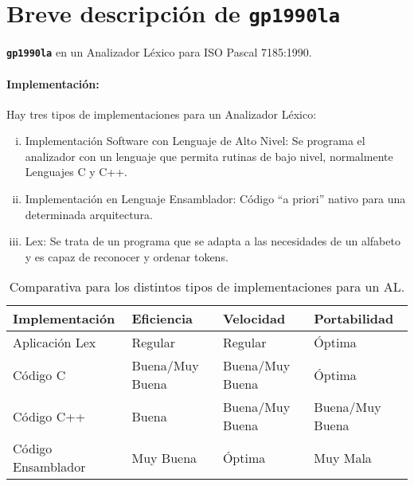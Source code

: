 \section{Breve descripción de {\tt gp1990la}}

 {}\textbf{{\tt gp1990la}} en un Analizador Léxico para ISO Pascal 7185:1990.

\paragraph*{Implementación:} Hay tres tipos de implementaciones para un Analizador Léxico:

\begin{enumerate}[i.]

\item Implementación Software con Lenguaje de Alto Nivel: Se programa el 
analizador con un lenguaje que permita rutinas de bajo nivel, normalmente 
Lenguajes C y C++.
\item Implementación en Lenguaje Ensamblador: Código ``a priori'' nativo para
una determinada arquitectura. 
\item {}Lex: Se trata de un programa
que se adapta a
las necesidades de un alfabeto y es capaz de reconocer y ordenar tokens. 

\end{enumerate}

\begin{table}[h]

\begin{center}

\begin{tabular}{|l|l|l|l|}\hline
\textbf{Implementación} & \textbf{Eficiencia} & \textbf{Velocidad} & 
\textbf{Portabilidad} \\ \hline
\hline
Aplicación Lex & Regular & Regular & Óptima \\ \hline
Código C & Buena/Muy Buena & Buena/Muy Buena & Óptima \\ \hline
Código C++ & Buena & Buena/Muy Buena & Buena/Muy Buena \\ \hline
Código Ensamblador & Muy Buena & Óptima & Muy Mala \\ \hline
\end{tabular}

\caption{Comparativa para los distintos tipos de implementaciones para un AL.}

\end{center}

\end{table}

